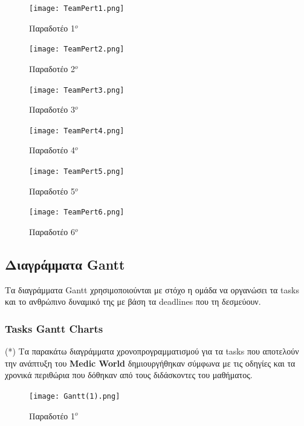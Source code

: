 \documentclass{article}
\begin{document}
\newpage

\begin{figure}[!htb]
\centering
\texttt{[image: TeamPert1.png]}
\caption{\label{fig:Pert1} Παραδοτέο 1$^o$}
\end{figure}

\begin{figure}[!htb]
\centering
\texttt{[image: TeamPert2.png]}
\caption{\label{fig:Pert2} Παραδοτέο 2$^o$}
\end{figure}
\begin{figure}[!htb]
\centering
\texttt{[image: TeamPert3.png]}
\caption{\label{fig:Pert3} Παραδοτέο 3$^o$}
\end{figure}

\newpage

\begin{figure}[!htb]
\centering
\texttt{[image: TeamPert4.png]}
\caption{\label{fig:Pert4} Παραδοτέο 4$^o$}
\end{figure}

\begin{figure}[!htb]
\centering
\texttt{[image: TeamPert5.png]}
\caption{\label{fig:Pert5} Παραδοτέο 5$^o$}
\end{figure}

\begin{figure}[!htb]
\centering
\texttt{[image: TeamPert6.png]}
\caption{\label{fig:Pert6} Παραδοτέο 6$^o$}
\end{figure}

\subsection{Διαγράμματα Gantt}

Τα διαγράμματα Gantt χρησιμοποιούνται με στόχο η ομάδα να οργανώσει τα tasks και το ανθρώπινο δυναμικό της με βάση τα deadlines που τη δεσμεύουν.

\subsubsection{Tasks Gantt Charts}

(*) Τα παρακάτω διαγράμματα χρονοπρογραμματισμού για τα tasks που αποτελούν την ανάπτυξη του \textbf{Medic World} δημιουργήθηκαν σύμφωνα με τις οδηγίες και τα χρονικά περιθώρια που δόθηκαν από τους διδάσκοντες του μαθήματος.

\newpage

\begin{figure}[!htb]
\centering
\texttt{[image: Gantt(1).png]}
\caption{\label{fig:Gantt1} Παραδοτέο 1$^o$}
\end{figure}
\end{document}
